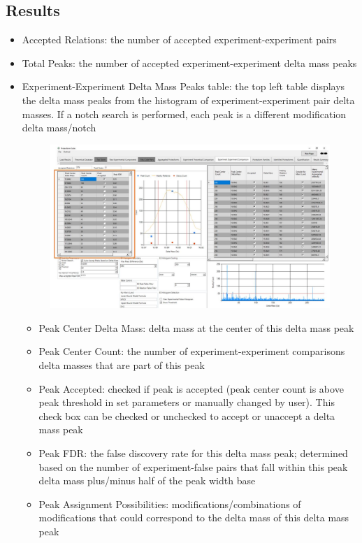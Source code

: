 \subsection{Results}
\begin{itemize}
	\item Accepted Relations: the number of accepted experiment-experiment pairs
	\item Total Peaks: the number of accepted experiment-experiment delta mass peaks
	\item Experiment-Experiment Delta Mass Peaks table: the top left table displays the delta mass peaks from the histogram of experiment-experiment pair delta masses. If a notch search is performed, each peak is a different modification delta mass/notch
	\begin{figure}[h]
\centering
\includegraphics[scale=0.43]{figures/ee2.jpg}
\end{figure}
	\begin{itemize}
		\item Peak Center Delta Mass: delta mass at the center of this delta mass peak 
		\item Peak Center Count: the number of experiment-experiment comparisons delta masses that are part of this peak
		\item Peak Accepted: checked if peak is accepted (peak center count is above peak threshold in set parameters or manually changed by user). This check box can be checked or unchecked to accept or unaccept a delta mass peak
		\item Peak FDR: the false discovery rate for this delta mass peak; determined based on the number of experiment-false pairs that fall within this peak delta mass plus/minus half of the peak width base
		\item Peak Assignment Possibilities: modifications/combinations of modifications that could correspond to the delta mass of this delta mass peak

\end{itemize}
\end{itemize}
